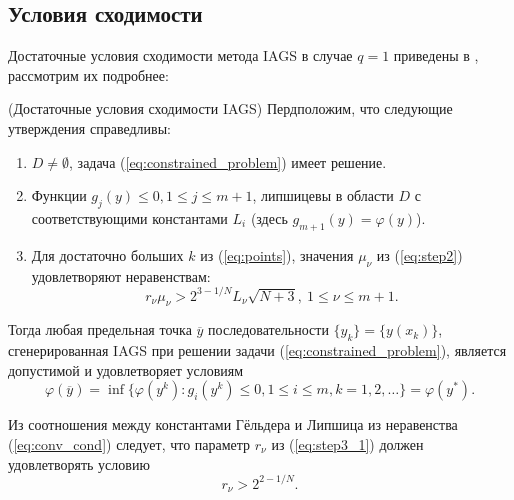 \subsection{Условия сходимости}
\label{sec:conv_method}

Достаточные условия сходимости метода IAGS в случае \(q=1\) приведены в \cite{Strongin2000}, рассмотрим их подробнее:
\begin{theorem} (Достаточные условия сходимости IAGS)
  \label{th:single_conv}
  Пердположим, что следующие утверждения справедливы:
  \begin{enumerate}
    \item \(D\ne\emptyset\), задача (\ref{eq:constrained_problem}) имеет решение.
    \item Функции \(g_j(y)\leqslant 0, 1\leqslant j\leqslant m + 1\), липшицевы в области \(D\) с соответствующими константами \(L_i\)
     (здесь \(g_{m+1}(y)=\varphi(y)\)).
    \item Для достаточно больших \(k\) из (\ref{eq:points}),
    значения \(\mu_\nu\) из (\ref{eq:step2}) удовлетворяют неравенствам:
    \begin{equation}
      r_\nu\mu_\nu > 2^{3-1/N}L_\nu \sqrt{N+3},\: 1\leqslant \nu \leqslant m + 1.
    \end{equation}
  \end{enumerate}
  Тогда любая предельная точка \(\overline{y}\) последовательности \(\{y_k\} = \{y(x_k)\}\), сгенерированная
  IAGS при решении задачи (\ref{eq:constrained_problem}), является допустимой и удовлетворяет условиям
\begin{equation}
  \varphi(\overline{y})=\inf\{ \varphi(y^k): g_i(y^k)\leqslant 0,1\leqslant i\leqslant m, k=1,2,\dots\}=\varphi(y^*).
\end{equation}
\end{theorem}

\begin{remark}
  \label{rem:r1}
  Из соотношения между константами Гёльдера и Липшица из неравенства (\ref{eq:conv_cond}) следует, что
  параметр \(r_\nu\) из (\ref{eq:step3_1}) должен удовлетворять условию
  \begin{equation}
    r_\nu > 2^{2 - 1/N}.
  \end{equation}
\end{remark}

